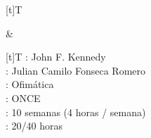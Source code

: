 \documentclass[letterpaper,10pt,spanish]{sphinxmanual}
\begin{document}
\begin{savenotes}\sphinxattablestart
\sphinxthistablewithglobalstyle
\centering
\begin{tabular}[t]{}
\sphinxtoprule
\sphinxtableatstartofbodyhook

\begin{savenotes}\sphinxattablestart
\sphinxthistablewithglobalstyle
\centering
\begin{tabulary}{\linewidth}[t]{T}
\sphinxtoprule
\sphinxtableatstartofbodyhook
\sphinxAtStartPar
{}
\\
\sphinxbottomrule
\end{tabulary}
\sphinxtableafterendhook\par
\sphinxattableend\end{savenotes}
&

\begin{savenotes}\sphinxattablestart
\sphinxthistablewithglobalstyle
\centering
\begin{tabulary}{\linewidth}[t]{T}
\sphinxtoprule
\sphinxtableatstartofbodyhook
\sphinxAtStartPar
{}: John F. Kennedy
\\
\sphinxhline
\sphinxAtStartPar
{}: Julian Camilo Fonseca Romero
\\
\sphinxhline
\sphinxAtStartPar
{}: Ofimática
\\
\sphinxhline
\sphinxAtStartPar
{}: ONCE
\\
\sphinxhline
\sphinxAtStartPar
{}: 10 semanas (4 horas / semana)
\\
\sphinxhline
\sphinxAtStartPar
{}: 20/40 horas
\\
\sphinxbottomrule
\end{tabulary}
\sphinxtableafterendhook\par
\sphinxattableend\end{savenotes}
\\
\sphinxbottomrule
\end{tabular}
\sphinxtableafterendhook\par
\sphinxattableend\end{savenotes}
\end{document}
